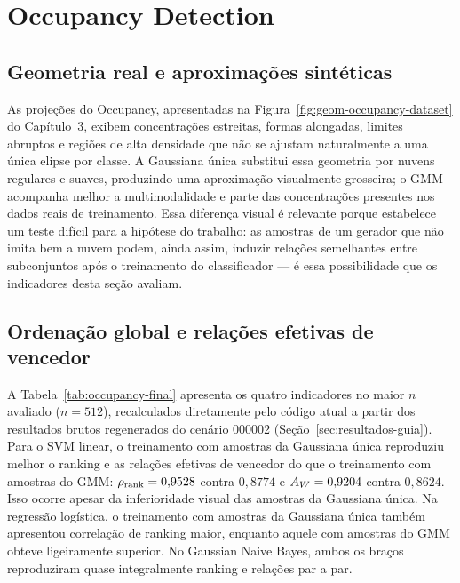 \section{Occupancy Detection}

\subsection{Geometria real e aproximações sintéticas}

As projeções do Occupancy, apresentadas na Figura~\ref{fig:geom-occupancy-dataset} do Capítulo~3, exibem concentrações estreitas, formas alongadas, limites abruptos e regiões de alta densidade que não se ajustam naturalmente a uma única elipse por classe. A Gaussiana única substitui essa geometria por nuvens regulares e suaves, produzindo uma aproximação visualmente grosseira; o GMM acompanha melhor a multimodalidade e parte das concentrações presentes nos dados reais de treinamento. Essa diferença visual é relevante porque estabelece um teste difícil para a hipótese do trabalho: as amostras de um gerador que não imita bem a nuvem podem, ainda assim, induzir relações semelhantes entre subconjuntos após o treinamento do classificador --- é essa possibilidade que os indicadores desta seção avaliam.

\subsection{Ordenação global e relações efetivas de vencedor}

A Tabela~\ref{tab:occupancy-final} apresenta os quatro indicadores no maior $n$ avaliado ($n=512$), recalculados diretamente pelo código atual a partir dos resultados brutos regenerados do cenário 000002 (Seção~\ref{sec:resultados-guia}). Para o SVM linear, o treinamento com amostras da Gaussiana única reproduziu melhor o ranking e as relações efetivas de vencedor do que o treinamento com amostras do GMM: $\rho_{\mathrm{rank}}=0{,}9528$ contra $0{,}8774$ e $A_W=0{,}9204$ contra $0{,}8624$. Isso ocorre apesar da inferioridade visual das amostras da Gaussiana única. Na regressão logística, o treinamento com amostras da Gaussiana única também apresentou correlação de ranking maior, enquanto aquele com amostras do GMM obteve \WinnersAgreement{} ligeiramente superior. No Gaussian Naive Bayes, ambos os braços reproduziram quase integralmente ranking e relações par a par.

